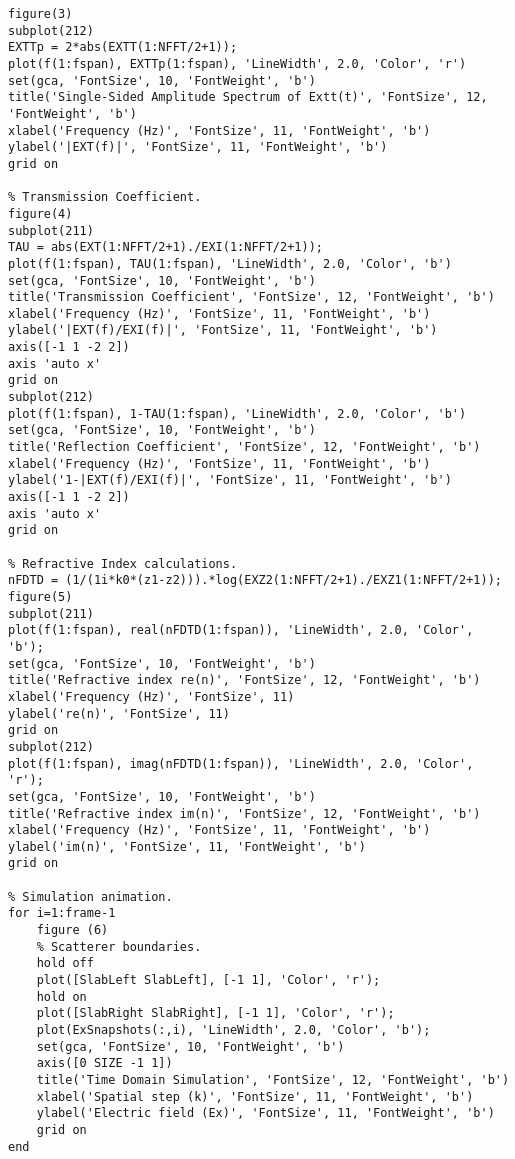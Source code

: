 \begin{lstlisting}
figure(3)
subplot(212)
EXTTp = 2*abs(EXTT(1:NFFT/2+1));
plot(f(1:fspan), EXTTp(1:fspan), 'LineWidth', 2.0, 'Color', 'r')
set(gca, 'FontSize', 10, 'FontWeight', 'b')
title('Single-Sided Amplitude Spectrum of Extt(t)', 'FontSize', 12, 'FontWeight', 'b')
xlabel('Frequency (Hz)', 'FontSize', 11, 'FontWeight', 'b')
ylabel('|EXT(f)|', 'FontSize', 11, 'FontWeight', 'b')
grid on

% Transmission Coefficient.
figure(4)
subplot(211)
TAU = abs(EXT(1:NFFT/2+1)./EXI(1:NFFT/2+1));
plot(f(1:fspan), TAU(1:fspan), 'LineWidth', 2.0, 'Color', 'b')
set(gca, 'FontSize', 10, 'FontWeight', 'b')
title('Transmission Coefficient', 'FontSize', 12, 'FontWeight', 'b')
xlabel('Frequency (Hz)', 'FontSize', 11, 'FontWeight', 'b')
ylabel('|EXT(f)/EXI(f)|', 'FontSize', 11, 'FontWeight', 'b')
axis([-1 1 -2 2])
axis 'auto x'
grid on
subplot(212)
plot(f(1:fspan), 1-TAU(1:fspan), 'LineWidth', 2.0, 'Color', 'b')
set(gca, 'FontSize', 10, 'FontWeight', 'b')
title('Reflection Coefficient', 'FontSize', 12, 'FontWeight', 'b')
xlabel('Frequency (Hz)', 'FontSize', 11, 'FontWeight', 'b')
ylabel('1-|EXT(f)/EXI(f)|', 'FontSize', 11, 'FontWeight', 'b')
axis([-1 1 -2 2])
axis 'auto x'
grid on

% Refractive Index calculations.
nFDTD = (1/(1i*k0*(z1-z2))).*log(EXZ2(1:NFFT/2+1)./EXZ1(1:NFFT/2+1));
figure(5)
subplot(211)
plot(f(1:fspan), real(nFDTD(1:fspan)), 'LineWidth', 2.0, 'Color', 'b');
set(gca, 'FontSize', 10, 'FontWeight', 'b')
title('Refractive index re(n)', 'FontSize', 12, 'FontWeight', 'b')
xlabel('Frequency (Hz)', 'FontSize', 11)
ylabel('re(n)', 'FontSize', 11)
grid on
subplot(212)
plot(f(1:fspan), imag(nFDTD(1:fspan)), 'LineWidth', 2.0, 'Color', 'r');
set(gca, 'FontSize', 10, 'FontWeight', 'b')
title('Refractive index im(n)', 'FontSize', 12, 'FontWeight', 'b')
xlabel('Frequency (Hz)', 'FontSize', 11, 'FontWeight', 'b')
ylabel('im(n)', 'FontSize', 11, 'FontWeight', 'b')
grid on

% Simulation animation.
for i=1:frame-1
    figure (6)
    % Scatterer boundaries.
    hold off
    plot([SlabLeft SlabLeft], [-1 1], 'Color', 'r');
    hold on
    plot([SlabRight SlabRight], [-1 1], 'Color', 'r');
    plot(ExSnapshots(:,i), 'LineWidth', 2.0, 'Color', 'b');
    set(gca, 'FontSize', 10, 'FontWeight', 'b')
    axis([0 SIZE -1 1])
    title('Time Domain Simulation', 'FontSize', 12, 'FontWeight', 'b')
    xlabel('Spatial step (k)', 'FontSize', 11, 'FontWeight', 'b')
    ylabel('Electric field (Ex)', 'FontSize', 11, 'FontWeight', 'b')
    grid on
end
\end{lstlisting}
